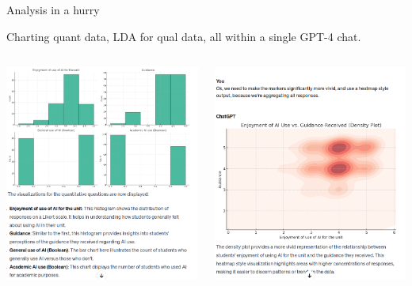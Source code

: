 \documentclass[xcolor={dvipsnames},aspectratio=169]{beamer}
\begin{document}
\begin{frame}{Analysis in a hurry}

Charting quant data, LDA for qual data, all within a single GPT-4 chat.

\begin{columns}
\begin{column}{0.3\textwidth}
\includegraphics[width=\textwidth]{Screenshot from 2023-12-12 11-28-52.png}
\end{column}
\begin{column}{0.3\textwidth}
\includegraphics[width=\textwidth]{Screenshot from 2023-12-12 11-30-43.png}

\end{column}
\end{columns}
\end{frame}
\end{document}
